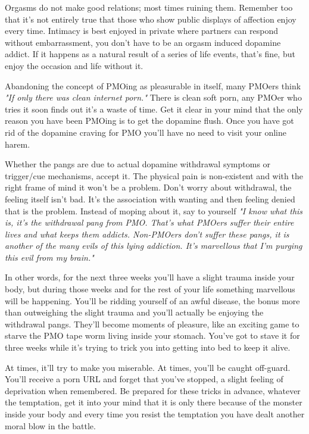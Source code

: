 \documentclass[easypeasy.tex]{subfiles}
\begin{document}
Orgasms do not make good relations; most times ruining them. Remember too that it's not entirely true that those who show public displays of affection enjoy every time. Intimacy is best enjoyed in private where partners can respond without embarrassment, you don't have to be an orgasm induced dopamine addict. If it happens as a natural result of a series of life events, that's fine, but enjoy the occasion and life without it.

Abandoning the concept of PMOing as pleasurable in itself, many PMOers think \textit{"If only there was clean internet porn."} There is clean soft porn, any PMOer who tries it soon finds out it's a waste of time. Get it clear in your mind that the only reason you have been PMOing is to get the dopamine flush. Once you have got rid of the dopamine craving for PMO you'll have no need to visit your online harem.

Whether the pangs are due to actual dopamine withdrawal symptoms or trigger/cue mechanisms, accept it. The physical pain is non-existent and with the right frame of mind it won't be a problem. Don't worry about withdrawal, the feeling itself isn't bad. It's the association with wanting and then feeling denied that is the problem. Instead of moping about it, say to yourself \textit{"I know what this is, it's the withdrawal pang from PMO. That's what PMOers suffer their entire lives and what keeps them addicts. Non-PMOers don't suffer these pangs, it is another of the many evils of this lying addiction. It's marvellous that I'm purging this evil from my brain."}

In other words, for the next three weeks you'll have a slight trauma inside your body, but during those weeks and for the rest of your life something marvellous will be happening. You'll be ridding yourself of an awful disease, the bonus more than outweighing the slight trauma and you'll actually be enjoying the withdrawal pangs. They'll become moments of pleasure, like an exciting game to starve the PMO tape worm living inside your stomach. You've got to stave it for three weeks while it's trying to trick you into getting into bed to keep it alive.

At times, it'll try to make you miserable. At times, you'll be caught off-guard. You'll receive a porn URL and forget that you've stopped, a slight feeling of deprivation when remembered. Be prepared for these tricks in advance, whatever the temptation, get it into your mind that it is only there because of the monster inside your body and every time you resist the temptation you have dealt another moral blow in the battle.
\end{document}
